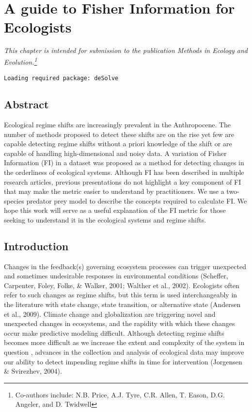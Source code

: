 \documentclass[12pt,twoside,openany]{reedthesis}
\begin{document}
\hypertarget{fiGuide}{%
\chapter{A guide to Fisher Information for Ecologists}\label{fiGuide}}

\emph{This chapter is intended for submission to the publication \emph{Methods in Ecology and Evolution}.\footnote{Co-authors include: N.B. Price, A.J. Tyre, C.R. Allen, T. Eason, D.G. Angeler, and D. Twidwell}}
\begin{verbatim}
Loading required package: deSolve
\end{verbatim}
\hypertarget{abstract-1}{%
\section{Abstract}\label{abstract-1}}

Ecological regime shifts are increasingly prevalent in the Anthropocene. The number of methods proposed to detect these shifts are on the rise yet few are capable detecting regime shifts without a priori knowledge of the shift or are capable of handling high-dimensional and noisy data. A variation of Fisher Information (FI) in a dataset was proposed as a method for detecting changes in the orderliness of ecological systems. Although FI has been described in multiple research articles, previous presentations do not highlight a key component of FI that may make the metric easier to understand by practitioners. We use a two-species predator prey model to describe the concepts required to calculate FI. We hope this work will serve as a useful explanation of the FI metric for those seeking to understand it in the ecological systems and regime shifts.

\hypertarget{introduction-1}{%
\section{Introduction}\label{introduction-1}}

Changes in the feedback(s) governing ecosystem processes can trigger unexpected and sometimes undesirable responses in environmental conditions (Scheffer, Carpenter, Foley, Folke, \& Walker, 2001; Walther et al., 2002). Ecologists often refer to such changes as regime shifts, but this term is used interchangeably in the literature with state change, state transition, or alternative state (Andersen et al., 2009). Climate change and globalization are triggering novel and unexpected changes in ecosystems, and the rapidity with which these changes occur make predictive modeling difficult. Although detecting regime shifts becomes more difficult as we increase the extent and complexity of the system in question , advances in the collection and analysis of ecological data may improve our ability to detect impending regime shifts in time for intervention (Jorgensen \& Svirezhev, 2004).
\end{document}
